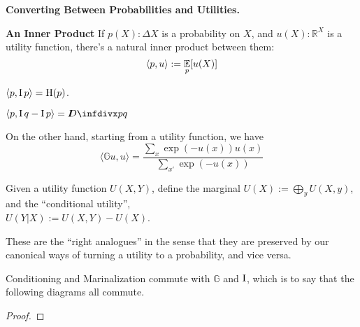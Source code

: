 \documentclass{article}
\newcommand\atleD{\scalerel*{\stackengine{-1pt}{%
  \rotatebox[origin=c]{30}{\rule{10pt}{.9pt}}\kern-1pt%
  \rotatebox[origin=c]{-30}{\rule{10pt}{1.3pt}}}{%
  \rule{.9pt}{10pt}}{O}{c}{F}{F}{S}}{\Delta}}
\newcommand{\Boltz}[1]{\mathbb G {#1}}
\begin{document}
    \textbf{Converting Between Probabilities and Utilities.}


    \textbf{An Inner Product}
    If $p(X) : \Delta X$ is a probability on $X$, and $u(X) : \mathbb R^{X}$ is a utility function, there's a natural inner product between them:
    \[
      \langle p, u \rangle := \operatorname*{\mathbb{E}}_p [u(X)]
    \]

    \begin{prop}
      $\displaystyle\langle p,  \operatorname{\mathrm{I}} p \rangle = \operatorname{\mathrm{H}}(p)$.
    \end{prop}
    \begin{prop}
        $\displaystyle\langle p, \I q - \I p\rangle = \kldiv pq $
    \end{prop}
    On the other hand, starting from a utility function, we have
    \[
      \langle \Boltz u, u \rangle
        = \frac{\sum_x \exp(-u(x)) u(x) }{\sum_{x'} \exp (-u(x))}
    \]

    \begin{defn}
    Given a utility function $U(X,Y)$, define the marginal $U(X) := \bigoplus_y U(X,y)$,
    and the ``conditional utility'',\\
    $U(Y|X) := U(X,Y) - U(X)$.
    \end{defn}



    These are the ``right analogues'' in the sense that they are preserved by our canonical ways of turning a utility to a probability, and vice versa.

    \begin{prop}
      Conditioning and Marinalization commute with  $\Boltz{}$ and $\operatorname{\mathrm{I}}$, which is to say that the following diagrams all commute.

      \begin{center}
        \quad
      \end{center}
    \end{prop}
    \begin{proof}

    \end{proof}
\end{document}
